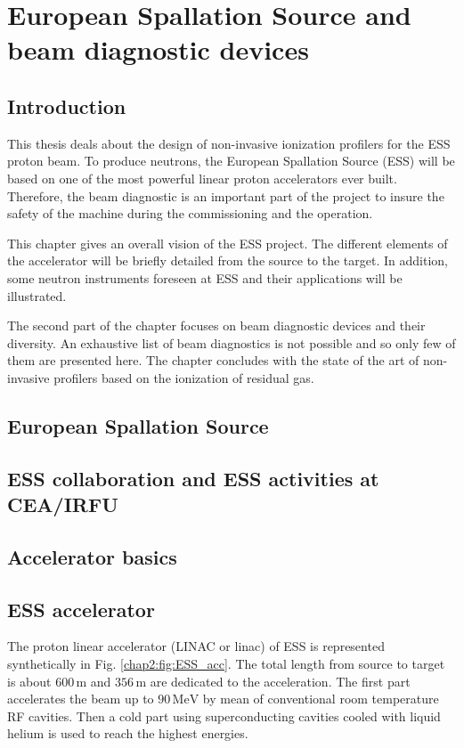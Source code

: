 \chapter{European Spallation Source and beam diagnostic devices}
\cleardoublepage

\minitoc
\section{Introduction}
\begin{refsection}
  \label{ch2:Introduction}
  This thesis deals about the design of non-invasive ionization profilers for the ESS proton beam. To produce neutrons, the European Spallation Source (ESS) will be based on one of the most powerful linear proton accelerators ever built. Therefore, the beam diagnostic is an important part of the project to insure the safety of the machine during the commissioning and the operation.

  This chapter gives an overall vision of the ESS project. The different elements of the accelerator will be briefly detailed from the source to the target. In addition, some neutron instruments foreseen at ESS and their applications will be illustrated.

  The second part of the chapter focuses on beam diagnostic devices and their diversity. An exhaustive list of beam diagnostics is not possible and so only few of them are presented here. The chapter concludes with the state of the art of non-invasive profilers based on the ionization of residual gas.

  \section{European Spallation Source}
  

  

  \section{ESS collaboration and ESS activities at CEA/IRFU}

  \section{Accelerator basics}

  \section{ESS accelerator}
  The proton linear accelerator (LINAC or linac) of ESS is represented synthetically in Fig. \ref{chap2:fig:ESS_acc}.
  The total length from source to target is about $600\,\mathrm{m}$ and $356\,\mathrm{m}$ are dedicated to the acceleration. The first part accelerates the beam up to $90\,\mathrm{MeV}$ by mean of conventional room temperature RF cavities. Then a cold part using superconducting cavities cooled with liquid helium is used to reach the highest energies.


\end{refsection}

